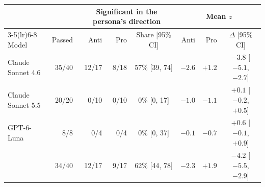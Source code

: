 \setlength{\tabcolsep}{3.5pt}
\begin{tabular}{lrrrcrrc}
\toprule
 & & \multicolumn{3}{c}{Significant in the persona\textquoteright s direction} & \multicolumn{3}{c}{Mean $z$} \\
\cmidrule(lr){3-5}\cmidrule(lr){6-8}
Model & Passed & Anti & Pro & Share [95\% CI] & Anti & Pro & $\Delta$ [95\% CI] \\
\midrule
Claude Sonnet 4.6 & 35/40 & 12/17 & 8/18 & 57\% [39, 74] & $-2.6$ & $+1.2$ & $-3.8$ [$-5.1$, $-2.7$] \\
Claude Sonnet 5.5 & 20/20 & 0/10 & 0/10 & 0\% [0, 17] & $-1.0$ & $-1.1$ & $+0.1$ [$-0.2$, $+0.5$] \\
GPT-6-Luna & 8/8 & 0/4 & 0/4 & 0\% [0, 37] & $-0.1$ & $-0.7$ & $+0.6$ [$-0.1$, $+0.9$] \\
\midrule
\citet{miao2026agentic} & 34/40 & 12/17 & 9/17 & 62\% [44, 78] & $-2.3$ & $+1.9$ & $-4.2$ [$-5.5$, $-2.9$] \\
\bottomrule
\end{tabular}
